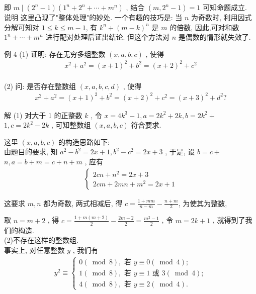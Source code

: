	即 $m \mid\left(2^{n}-1\right)\left(1^{n}+2^{n}+\cdots+m^{n}\right)$ , 结合 $\left(m, 2^{n}-1\right)=1$ 可知命题成立.\\
	说明 这里凸现了"整体处理"的妙处. 一个有趣的技巧是: 当 $n$ 为奇数时, 利用因式分解可知对 $1 \leqslant k \leqslant m-1$, 有 $k^{n}+(m-k)^{n}$ 是 $m$ 的倍数, 因此,可对和数 $1^{n}+\cdots+m^{n}$ 进行配对处理后证出结论. 但这个方法对 $n$ 是偶数的情形就失效了.

	例 4 (1) 证明: 存在无穷多组整数 $(x, a, b, c)$ , 使得
	\begin{align*}
		x^{2}+a^{2}=(x+1)^{2}+b^{2}=(x+2)^{2}+c^{2}
	\end{align*}\\
	(2) 问: 是否存在整数组 $(x, a, b, c, d)$ , 使得
	\begin{align*}
		x^{2}+a^{2}=(x+1)^{2}+b^{2}=(x+2)^{2}+c^{2}=(x+3)^{2}+d^{2} ?
	\end{align*}

	解 (1) 对大于 1 的正整数 $k$ , 令 $x=4 k^{3}-1, a=2 k^{2}+2 k, b=2 k^{2}+$ $1, c=2 k^{2}-2 k$ , 可知整数组 $(x, a, b, c)$ 符合要求.

	这里 $(x, a, b, c)$ 的构造思路如下:\\
	由题目的要求, 知 $a^{2}-b^{2}=2 x+1 ,  b^{2}-c^{2}=2 x+3$ , 于是, 设 $b=c+$ $n, a=b+m=c+n+m$ , 应有
	\begin{align*}
		\left\{\begin{array}{l}
			       2 c n+n^{2}=2 x+3 \\
			       2 c m+2 m n+m^{2}=2 x+1
		       \end{array}\right.
	\end{align*}

	这要求 $m ,  n$ 都为奇数, 两式相减后, 得 $c=\frac{1+m m}{n-m}-\frac{n+m}{2}$, 为使其为整数,

	取 $n=m+2$ , 得 $c=\frac{1+m(m+2)}{2}-\frac{2 m+2}{2}=\frac{m^{2}-1}{2}$ , 令 $m=2 k+1$ , 就得到了我们的构造. \\
	(2)不存在这样的整数组.\\
	事实上, 对任意整数 $y$ , 我们有
	\begin{align*}
		y^{2} \equiv\left\{\begin{array}{l}
			                   0(\bmod 8), \text { 若 } y \equiv 0(\bmod 4) ;                \\
			                   1(\bmod 8), \text { 若 } y \equiv 1 \text { 或 } 3(\bmod 4) ; \\
			                   4(\bmod 8), \text { 若 } y \equiv 2(\bmod 4) .
		                   \end{array}\right.
	\end{align*}

